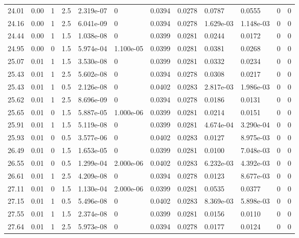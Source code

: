 \documentclass[preview]{standalone}
\begin{document}
{{{{\begin{tabular}{L{1.2cm}C{1.2cm} C{0.3cm}C{0.5cm} C{1.4cm}C{1.4cm} C{1.4cm}C{1.4cm} C{1.6cm}C{1.6cm} C{1.6cm}C{1.6cm}}
  24.01  &  0.00  & 1     & 2.5 &  2.319e-07  & 0  &  0.0394&   0.0278& 0.0787 & 0.0555   &  0 & 0  \\ 
  24.16  &  0.00  & 1     & 2.5 &  6.041e-09  & 0  &  0.0394&   0.0278& 1.629e-03 & 1.148e-03   &  0 & 0  \\ 
  24.44  &  0.00  & 1     & 1.5 &  1.038e-08  & 0  &  0.0399&   0.0281& 0.0244 & 0.0172   &  0 & 0  \\ 
  24.95  &  0.00  & 0     & 1.5 &  5.974e-04  & 1.100e-05  &  0.0399&   0.0281& 0.0381 & 0.0268   &  0 & 0  \\ 
  25.07  &  0.01  & 1     & 1.5 &  3.530e-08  & 0  &  0.0399&   0.0281& 0.0332 & 0.0234   &  0 & 0  \\ 
  25.43  &  0.01  & 1     & 2.5 &  5.602e-08  & 0  &  0.0394&   0.0278& 0.0308 & 0.0217   &  0 & 0  \\ 
  25.43  &  0.01  & 1     & 0.5 &  2.126e-08  & 0  &  0.0402&   0.0283& 2.817e-03 & 1.986e-03   &  0 & 0  \\ 
  25.62  &  0.01  & 1     & 2.5 &  8.696e-09  & 0  &  0.0394&   0.0278& 0.0186 & 0.0131   &  0 & 0  \\ 
  25.65  &  0.01  & 0     & 1.5 &  5.887e-05  & 1.000e-06  &  0.0399&   0.0281& 0.0214 & 0.0151   &  0 & 0  \\ 
  25.91  &  0.01  & 1     & 1.5 &  5.119e-08  & 0  &  0.0399&   0.0281& 4.674e-04 & 3.290e-04   &  0 & 0  \\ 
  25.93  &  0.01  & 0     & 0.5 &  3.577e-06  & 0  &  0.0402&   0.0283& 0.0127 & 8.975e-03   &  0 & 0  \\ 
  26.49  &  0.01  & 0     & 1.5 &  1.653e-05  & 0  &  0.0399&   0.0281& 0.0100 & 7.048e-03   &  0 & 0  \\ 
  26.55  &  0.01  & 0     & 0.5 &  1.299e-04  & 2.000e-06  &  0.0402&   0.0283& 6.232e-03 & 4.392e-03   &  0 & 0  \\ 
  26.61  &  0.01  & 1     & 2.5 &  4.209e-08  & 0  &  0.0394&   0.0278& 0.0123 & 8.677e-03   &  0 & 0  \\ 
  27.11  &  0.01  & 0     & 1.5 &  1.130e-04  & 2.000e-06  &  0.0399&   0.0281& 0.0535 & 0.0377   &  0 & 0  \\ 
  27.15  &  0.01  & 1     & 0.5 &  5.496e-08  & 0  &  0.0402&   0.0283& 8.369e-03 & 5.898e-03   &  0 & 0  \\ 
  27.55  &  0.01  & 1     & 1.5 &  2.374e-08  & 0  &  0.0399&   0.0281& 0.0156 & 0.0110   &  0 & 0  \\ 
  27.64  &  0.01  & 1     & 2.5 &  5.973e-08  & 0  &  0.0394&   0.0278& 0.0177 & 0.0124   &  0 & 0  \\ 

\end{tabular}}}}}
\end{document}
